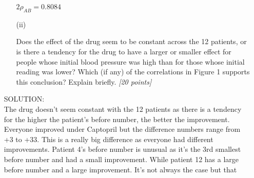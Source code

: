 \documentclass[12pt]{article}
\begin{document}
\begin{itemize}
\begin{itemize}
$2 \rho_{AB} = 0.8084 $




\item[(ii)]

Does the effect of the drug seem to be constant across the 12 patients, or
is there a tendency for the drug to have a larger or smaller effect for
people whose initial blood pressure was high than for those whose initial
reading was lower? Which (if any) of the correlations in Figure 1 supports this
conclusion? Explain briefly. \textit{[20 points]}

\end{itemize}

SOLUTION: \\
The drug doesn't seem constant with the 12 patients as there is a tendency for the higher the patient's before number, the better the improvement. Everyone improved under Captopril but the difference numbers range from +3 to +33. This is a really big difference as everyone had different improvements. Patient 4's before number is unusual as it's the 3rd smallest before number and had a small improvement. While patient 12 has a large before number and a large improvement. It's not always the case but that

\end{itemize}
\end{document}
